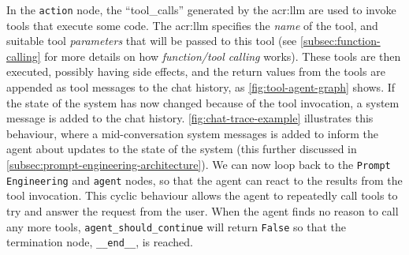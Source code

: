 In the \texttt{action} node, the \enquote{tool\_calls} generated by the \acrshort{acr:llm} are used to invoke tools that execute some code. The \acrshort{acr:llm} specifies the \textit{name} of the tool, and suitable tool \textit{parameters} that will be passed to this tool (see \autoref{subsec:function-calling} for more details on how \textit{function/tool calling} works). These tools are then executed, possibly having side effects, and the return values from the tools are appended as tool messages to the chat history, as \autoref{fig:tool-agent-graph} shows. If the state of the system has now changed because of the tool invocation, a system message is added to the chat history. \autoref{fig:chat-trace-example} illustrates this behaviour, where a mid-conversation system messages is added to inform the agent about updates to the state of the system (this further discussed in \autoref{subsec:prompt-engineering-architecture}). We can now loop back to the \texttt{Prompt Engineering} and \texttt{agent} nodes, so that the agent can react to the results from the tool invocation. This cyclic behaviour allows the agent to repeatedly call tools to try and answer the request from the user. When the agent finds no reason to call any more tools, \texttt{agent\_should\_continue} will return \texttt{False} so that the termination node, \texttt{\_\_end\_\_}, is reached.


